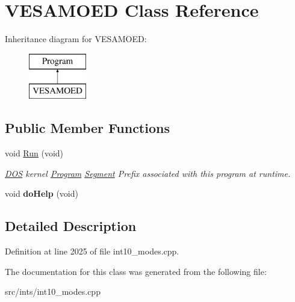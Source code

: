 \hypertarget{classVESAMOED}{\section{V\-E\-S\-A\-M\-O\-E\-D Class Reference}
\label{classVESAMOED}
}
Inheritance diagram for V\-E\-S\-A\-M\-O\-E\-D\-:\begin{figure}[H]
\begin{center}
\leavevmode
\includegraphics[height=2.000000cm]{classVESAMOED}
\end{center}
\end{figure}
\subsection*{Public Member Functions}
\begin{DoxyCompactItemize}
\item 
\hypertarget{classVESAMOED_a28a85c525cde20cbffbfbed307b1747e}{void \hyperlink{classVESAMOED_a28a85c525cde20cbffbfbed307b1747e}{Run} (void)}\label{classVESAMOED_a28a85c525cde20cbffbfbed307b1747e}

\begin{DoxyCompactList}\small\item\em \hyperlink{classDOS}{D\-O\-S} kernel \hyperlink{classProgram}{Program} \hyperlink{structSegment}{Segment} Prefix associated with this program at runtime. \end{DoxyCompactList}\item 
\hypertarget{classVESAMOED_a2c8bf90a08d8a67761958333dcbf298b}{void {\bfseries do\-Help} (void)}\label{classVESAMOED_a2c8bf90a08d8a67761958333dcbf298b}

\end{DoxyCompactItemize}


\subsection{Detailed Description}


Definition at line 2025 of file int10\-\_\-modes.\-cpp.



The documentation for this class was generated from the following file\-:\begin{DoxyCompactItemize}
\item 
src/ints/int10\-\_\-modes.\-cpp\end{DoxyCompactItemize}
